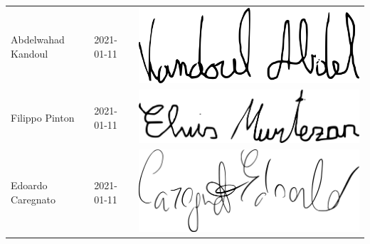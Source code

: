 {\begin{longtable}{ C{5cm} C{4cm} C{5cm} }
		{Abdelwahad Kandoul} & 2021-01-11 & \includegraphics[scale=0.20]{./src/Organigramma/immagini/firme/abdel.png}\\
		{Filippo Pinton} & 2021-01-11 & \includegraphics[scale=0.20]{./src/Organigramma/immagini/firme/Elvis.png}\\
		{Edoardo Caregnato} & 2021-01-11 & \includegraphics[scale=0.20]{./src/Organigramma/immagini/firme/edoardo.png}
	\end{longtable}
}


